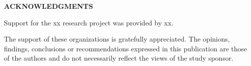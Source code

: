 \begin{center}
    {\fontsize{18pt}{0pt} \MakeUppercase{\textbf{acknowledgments}}}
\vspace*{24pt}
\end{center}


Support for the xx research project was provided by xx. 



The support of these organizations is gratefully appreciated. The opinions, findings, conclusions or recommendations expressed in this publication are those of the authors and do not necessarily reflect the views of the study sponsor.
 

